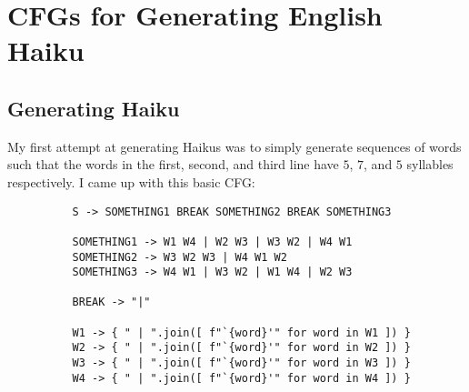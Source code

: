 \section{CFGs for Generating English Haiku}

\subsection{Generating Haiku}

\begin{enumarabic}
  \item My first attempt at generating Haikus was to simply generate sequences of words
    such that the words in the first, second, and third line have $5$, $7$, and $5$ syllables respectively.
    I came up with this basic CFG:

    \begin{center}
      \begin{small}
        \begin{verbatim}
          S -> SOMETHING1 BREAK SOMETHING2 BREAK SOMETHING3
            
          SOMETHING1 -> W1 W4 | W2 W3 | W3 W2 | W4 W1
          SOMETHING2 -> W3 W2 W3 | W4 W1 W2
          SOMETHING3 -> W4 W1 | W3 W2 | W1 W4 | W2 W3
          
          BREAK -> "|"
          
          W1 -> { " | ".join([ f"`{word}'" for word in W1 ]) }
          W2 -> { " | ".join([ f"`{word}'" for word in W2 ]) }
          W3 -> { " | ".join([ f"`{word}'" for word in W3 ]) }
          W4 -> { " | ".join([ f"`{word}'" for word in W4 ]) }
        \end{verbatim} 
      \end{small}
    \end{center}


\end{enumarabic}
